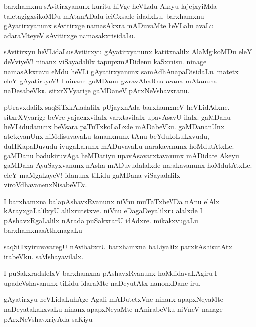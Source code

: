 \begin{mng}
barxhamxnu sAvitirxyanunx kuritu hiVge heVLalu Akeyu lajejxyiMda taletagigxsikoMDu mAtanADalu iciCxsade idadxLu. barxhamxnu gAyatirxyanunx sAvitirxge namasAkxra mADuvaMte heVLalu avaLu adaraMteyeV sAvitirxge namasakxrisidaLu.
\end{mng}

\begin{mng}
sAvitirxyu heVLidaLu\mdash sAvitirxyu gAyatirxyanunx katitxnalilx AlaMgikoMDu eleY deVviyeV! ninanx viSayadalilx tapupxmADidenu kaSxmisu. ninage namasAkxravu eMdu heVLi gAyatirxyanunx samAdhAnapaDisidaLu. matetx eleY gAyatirxyeV! I ninanx gaMDanu gwravAhaRnu avana mAtanunx naDesabeVku. sitxrXVyarige gaMDaneV pArxNeVshavxranu.
\end{mng}

\begin{mng}
pUravxdalilx saqSiTxkAladalilx pUjayxnAda barxhamxneV heVLidAdxne. sitxrXVyarige beVre yajacnxvilalx varxtavilalx upavAsavU ilalx. gaMDanu heVLidudanunx beVsara paTuTxkoLaLxde mADabeVku. gaMDananUnx atetxyanUnx niMdisuvavaLu tananxnunx tAnu beYdukoLuLxvudu, duHKapaDuvudu ivugaLanunx mADuvavaLu narakavanunx hoMdutAtxLe. gaMDanu badukiruvAga heMDatiyu upavAsavarxtavanunx mADidare Akeyu gaMDana AyuSayxvanunx nAsha mADuvudalalxde narakavanunx hoMdutAtxLe. eleY maMgaLayeV! idanunx tiLidu gaMDana viSayadalilx viroVdhavanenxNisabeVDa.
\end{mng}

\begin{mng}
I barxhamxna balapAshavxRvanunx niVnu muTaTxbeVDa nAnu elAlx kArayxgaLalilxyU alilxrutetxve. niVnu eDagaDeyalilxru alalxde I pAshavxRgaLalilx nArada puSakxrarU idAdxre. mikakxvugaLu barxhamxnasAthxnagaLu
\end{mng}

\begin{mng}
saqSiTxyiruvavaregU nAvibabxrU barxhamxna baLiyalilx parxkAshisutAtx irabeVku. saMshayavilalx.
\end{mng}

\begin{mng}
I puSakxradalelxV barxhamxna pAshavxRvanunx hoMdidavaLAgiru I upadeVshavanunx tiLidu idaraMte naDeyutAtx nanonxDane iru.
\end{mng}

\begin{mng}
gAyatirxyu heVLidaLu\mdash hAge Agali mADutetxVne ninanx apapxNeyaMte naDeyatakakxvaLu ninanx apapxNeyaMte nAnirabeVku niVneV nanage pArxNeVshavxriyAda saKiyu
\end{mng}


